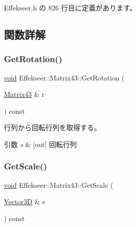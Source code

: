  Effekseer.\+h の 826 行目に定義があります。



\subsection{関数詳解}
\mbox{\label{struct_effekseer_1_1_matrix43_a66360ac2c7e8ef69819409d3d44dbba1}} 
\subsubsection{\texorpdfstring{Get\+Rotation()}{GetRotation()}}
{\footnotesize\ttfamily \mbox{\hyperlink{namespace_effekseer_ab34c4088e512200cf4c2716f168deb56}{void}} Effekseer\+::\+Matrix43\+::\+Get\+Rotation (\begin{DoxyParamCaption}\item[{\mbox{\hyperlink{struct_effekseer_1_1_matrix43}{Matrix43}} \&}]{r }\end{DoxyParamCaption}) const}



行列から回転行列を取得する。 


\begin{DoxyParams}{引数}
{\em s} & \mbox{[}out\mbox{]} 回転行列 \\
\hline
\end{DoxyParams}
\mbox{\label{struct_effekseer_1_1_matrix43_afeae9f15d80c7d4965c307e3b3cf9462}} 
\subsubsection{\texorpdfstring{Get\+Scale()}{GetScale()}}
{\footnotesize\ttfamily \mbox{\hyperlink{namespace_effekseer_ab34c4088e512200cf4c2716f168deb56}{void}} Effekseer\+::\+Matrix43\+::\+Get\+Scale (\begin{DoxyParamCaption}\item[{\mbox{\hyperlink{struct_effekseer_1_1_vector3_d}{Vector3D}} \&}]{s }\end{DoxyParamCaption}) const}



